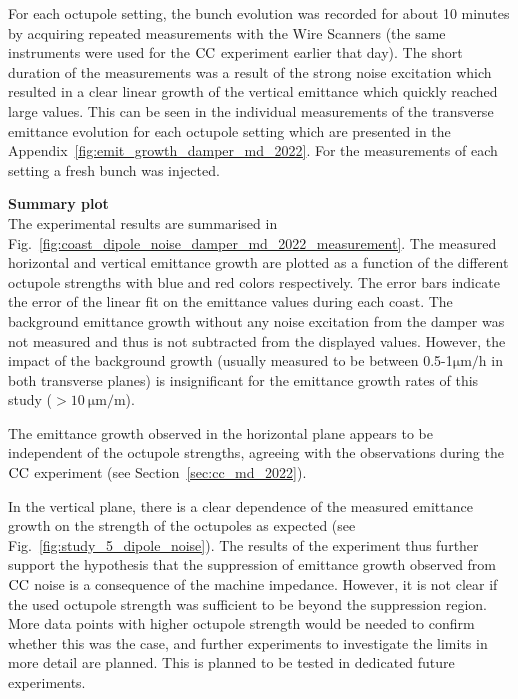 For each octupole setting, the bunch evolution was recorded for about 10 minutes by acquiring repeated measurements with the Wire Scanners (the same instruments were used for the ${\mathrm{CC}}$ experiment earlier that day). The short duration of the measurements was a result of the strong noise excitation which resulted in a clear linear growth of the vertical emittance which quickly reached large values. This can be seen in the individual measurements of the transverse emittance evolution for each octupole setting which are presented in the Appendix~\ref{fig:emit_growth_damper_md_2022}. For the measurements of each setting a fresh bunch was injected. 

\textbf{Summary plot}\\
The experimental results are summarised in Fig.~\ref{fig:coast_dipole_noise_damper_md_2022_measurement}. The measured horizontal and vertical emittance growth are plotted as a function of the different octupole strengths with blue and red colors respectively. The error bars indicate the error of the linear fit on the emittance values during each coast. The background emittance growth without any noise excitation from the damper was not measured and thus is not subtracted from the displayed values. However, the impact of the background growth (usually measured to be between 0.5-1$\mathrm{\mu m/h}$ in both transverse planes) is insignificant for the emittance growth rates of this study ($ > 10 \ \mathrm{\mu m/m}$).
 

The emittance growth observed in the horizontal plane appears to be independent of the octupole strengths, agreeing with the observations during the ${\mathrm{CC}}$ experiment (see Section~\ref{sec:cc_md_2022}). 

In the vertical plane, there is a clear dependence of the measured emittance growth on the strength of the octupoles as expected (see Fig.~\ref{fig:study_5_dipole_noise}). The results of the experiment thus further support the hypothesis that the suppression of emittance growth observed from ${\mathrm{CC}}$ noise is a consequence of the machine impedance. However, it is not clear if the used octupole strength was sufficient to be beyond the suppression region. More data points with higher octupole strength would be needed to confirm whether this was the case, and further experiments to investigate the limits in more detail are planned. This is planned to be tested in dedicated future experiments.

